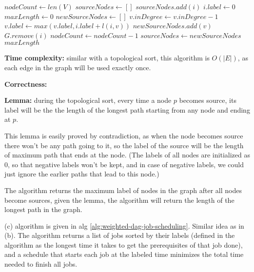 \documentclass{article}
\begin{document}
\begin{description}
\begin{algorithm}[h]
\begin{algorithmic}[1]
      \State $nodeCount \gets len(V)$
      \State $sourceNodes \gets []$
          \State $sourceNodes.add(i)$
          \State $i.label \gets 0$
        \EndIf
      \EndFor
      \State $maxLength \gets 0$
        \State $newSourceNodes \gets []$
            \State $v.inDegree \gets v.inDegree - 1$
            \State $v.label \gets max(v.label, i.label + l(i,v))$
            \EndIf
              \State $newSourceNodes.add(v)$
            \EndIf
          \EndFor
          \State $G.remove(i)$
          \State $nodeCount \gets nodeCount - 1$
        \EndFor
        \State $sourceNodes \gets newSourceNodes$
      \EndWhile
      \State \Return $maxLength$
    \EndFunction
    
    \end{algorithmic}
  \end{algorithm}

  \textbf{Time complexity:} similar with a topological sort, this algorithm is $O(|E|)$, as each edge in the graph will be used exactly once.

  \textbf{Correctness:} 

  \textbf{Lemma:} during the topological sort, every time a node $p$ becomes source, its label will be the the length of the longest path starting from any node and ending at $p$. 

  This lemma is easily proved by contradiction, as when the node becomes source there won't be any path going to it, so the label of the source will be the length of maximum path that ends at the node. (The labels of all nodes are initialized as 0, so that negative labels won't be kept, and in case of negative labels, we could just ignore the earlier paths that lead to this node.)

  The algorithm returns the maximum label of nodes in the graph after all nodes become sources, given the lemma, the algorithm will return the length of the longest path in the graph.

  (c) algorithm is given in alg \ref{alg:weighted-dag-job-scheduling}. Similar idea as in (b). The algorithm returns a list of jobs sorted by their labels (defined in the algorithm as the longest time it takes to get the prerequisites of that job done), and a schedule that starts each job at the labeled time minimizes the total time needed to finish all jobs.


\end{description}
\end{document}
